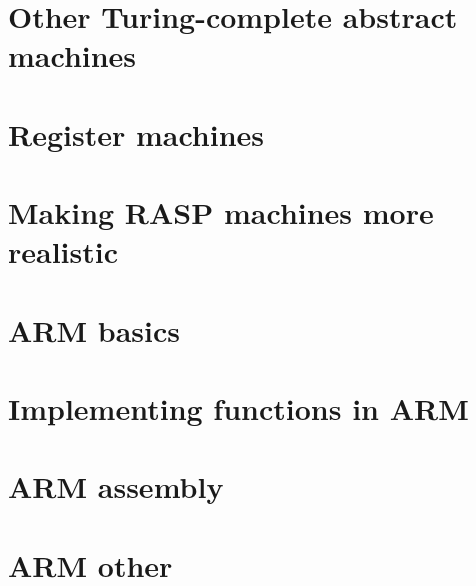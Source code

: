 \documentclass[oneside]{book}
\begin{document}
\part{Other Turing-complete abstract machines}


\part{Register machines}







\part{Making RASP machines more realistic}




\part{ARM basics}





\part{Implementing functions in ARM}




\part{ARM assembly}




\part{ARM other}

\end{document}
